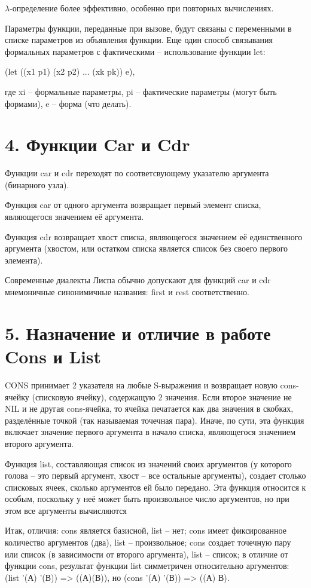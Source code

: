 \documentclass[12pt]{report}
\begin{document}
$\lambda$-определение более эффективно, особенно при повторных вычислениях. 

Параметры функции, переданные при вызове, будут связаны с переменными в списке параметров из объявления функции. Еще один способ связывания формальных параметров с фактическими -- использование функции let:

(let ((x1 p1) (x2 p2) ... (xk pk))  e),

где xi -- формальные параметры, pi -- фактические параметры (могут быть формами), e -- форма (что делать).

\section*{4. Функции Car и Cdr}

Функции car и cdr переходят по соответсвующему указателю аргумента (бинарного узла).

Функция car от одного аргумента возвращает первый элемент списка, являющегося значением её аргумента. 

Функция cdr возвращает хвост списка, являющегося значением её единственного аргумента (хвостом, или остатком списка является список  без своего первого элемента).  

Современные диалекты  Лиспа обычно допускают для функций car и cdr мнемоничные синонимичные названия: first и rest соответственно.

\section*{5. Назначение и отличие в работе Cons и List}

CONS принимает 2 указателя на любые S-выражения и возвращает новую cons-ячейку (списковую ячейку), содержащую 2 значения. Если второе значение не NIL и не другая cons-ячейка, то ячейка печатается как два значения в скобках, разделённые точкой (так называемая точечная пара). Иначе, по сути, эта функция включает значение первого аргумента в начало списка, являющегося значением второго аргумента. 

Функция list, составляющая список из значений своих аргументов (у которого голова -- это первый аргумент, хвост -- все остальные аргументы), создает столько списковых ячеек, сколько аргументов ей было передано. Эта функция относится к особым, поскольку у неё может быть произвольное число аргументов, но при этом все аргументы вычисляются

Итак, отличия: cons является базисной, list -- нет; cons имеет  фиксированное количество аргументов (два), list -- произвольное; cons создает точечную пару или список (в зависимости от второго аргумента), list -- список; в отличие от функции cons, результат функции list симметричен относительно аргументов: (list '(А) '(В)) => ((А)(В)), но (cons '(А) '(В)) => ((А) В).
\end{document}
